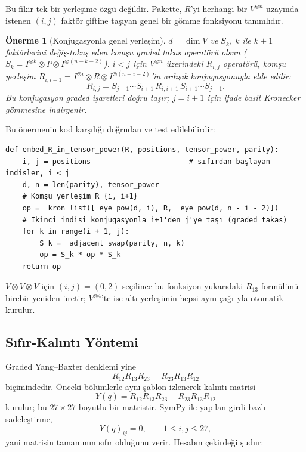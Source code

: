 \documentclass[10pt]{math}
\numberwithin{equation}{section}
\theoremstyle{plain}
\newtheorem{proposition}[theorem]{Önerme}
\theoremstyle{definition}
\begin{document}
Bu fikir tek bir yerleşime özgü değildir. Pakette, $R$'yi herhangi bir
$V^{\otimes n}$ uzayında istenen $(i,j)$ faktör çiftine taşıyan genel bir gömme
fonksiyonu tanımlıdır.

\begin{proposition}[Konjugasyonla genel yerleşim]\label{prop:embed}
$d=\dim V$ ve $S_k$, $k$ ile $k{+}1$ faktörlerini değiş-tokuş eden komşu graded
takas operatörü olsun ($S_k=I^{\otimes k}\otimes P\otimes I^{\otimes(n-k-2)}$).
$i<j$ için $V^{\otimes n}$ üzerindeki $R_{i,j}$ operatörü, komşu yerleşim
$R_{i,i+1}=I^{\otimes i}\otimes R\otimes I^{\otimes(n-i-2)}$'in ardışık
konjugasyonuyla elde edilir:
\[
R_{i,j}=S_{j-1}\cdots S_{i+1}\,R_{i,i+1}\,S_{i+1}\cdots S_{j-1}.
\]
Bu konjugasyon graded işaretleri doğru taşır; $j=i+1$ için ifade basit Kronecker
gömmesine indirgenir.
\end{proposition}

Bu önermenin kod karşılığı doğrudan ve test edilebilirdir:

\begin{lstlisting}[style=pyblock,caption={$R$-matrisini $V^{\otimes n}$ içinde $(i,j)$ faktörlerine gömme}]
def embed_R_in_tensor_power(R, positions, tensor_power, parity):
    i, j = positions                       # sıfırdan başlayan indisler, i < j
    d, n = len(parity), tensor_power
    # Komşu yerleşim R_{i, i+1}
    op = _kron_list([_eye_pow(d, i), R, _eye_pow(d, n - i - 2)])
    # İkinci indisi konjugasyonla i+1'den j'ye taşı (graded takas)
    for k in range(i + 1, j):
        S_k = _adjacent_swap(parity, n, k)
        op = S_k * op * S_k
    return op
\end{lstlisting}

$V\otimes V\otimes V$ için $(i,j)=(0,2)$ seçilince bu fonksiyon yukarıdaki
$R_{13}$ formülünü birebir yeniden üretir; $V^{\otimes 4}$'te ise altı
yerleşimin hepsi aynı çağrıyla otomatik kurulur.

\subsection{Sıfır-Kalıntı Yöntemi}

Graded Yang--Baxter denklemi yine
\[
R_{12}R_{13}R_{23}=R_{23}R_{13}R_{12}
\]
biçimindedir. Önceki bölümlerle aynı şablon izlenerek kalıntı matrisi
\[
Y(q)=R_{12}R_{13}R_{23}-R_{23}R_{13}R_{12}
\]
kurulur; bu $27\times 27$ boyutlu bir matristir. SymPy ile yapılan girdi-bazlı
sadeleştirme,
\[
Y(q)_{ij}=0,\qquad 1\leq i,j\leq 27,
\]
yani matrisin tamamının sıfır olduğunu verir. Hesabın çekirdeği şudur:
\end{document}
